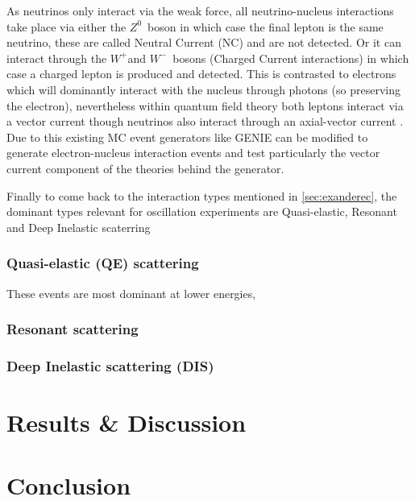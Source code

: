 \documentclass[a4paper,12pt]{article}
\newcommand{\Zz}{$Z^0$}
\newcommand{\Wp}{$W^+$}
\newcommand{\Wm}{$W^-$}
\begin{document}
As neutrinos only interact via the weak force, all neutrino-nucleus interactions take place via either the \Zz\ boson in which case the final lepton is the same neutrino, these are called Neutral Current (NC) and are not detected.
Or it can interact through the \Wp and \Wm\ bosons (Charged Current interactions) in which case a charged lepton is produced and detected.
This is contrasted to electrons which will dominantly interact with the nucleus through photons (so preserving the electron), nevertheless within quantum field theory both leptons interact via a vector current though neutrinos also interact through an axial-vector current \cite{alvarez-rusoNuSTEC11NeutrinoScattering2018}.
Due to this existing MC event generators like GENIE can be modified to generate electron-nucleus interaction events and test particularly the vector current component of the theories behind the generator.

Finally to come back to the interaction types mentioned in \cref{sec:exanderec}, the dominant types relevant for oscillation experiments are Quasi-elastic, Resonant and Deep Inelastic scaterring

\subsubsection{Quasi-elastic (QE) scattering}
These events are most dominant at lower energies, 


\subsubsection{Resonant scattering}
\subsubsection{Deep Inelastic scattering (DIS)}




\newpage


\section{Results \& Discussion}

\section{Conclusion}

\printbibliography
\end{document}
